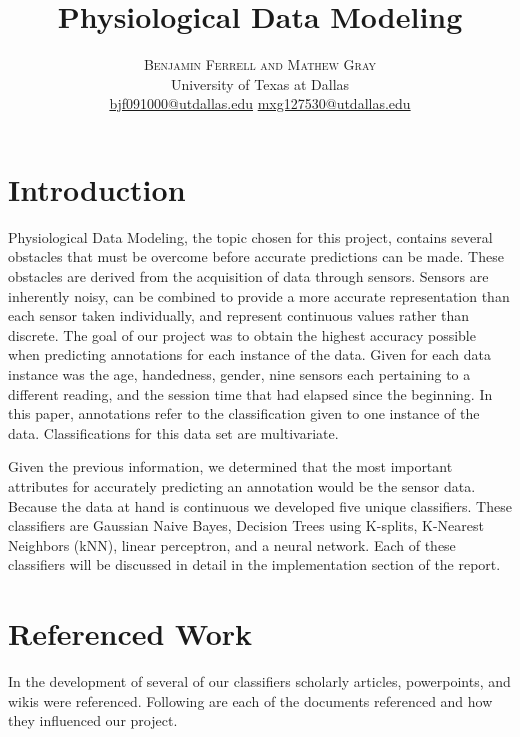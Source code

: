 \documentclass[twoside]{article}
\title{\vspace{-15mm}\fontsize{24pt}{10pt}\selectfont\textbf{Physiological Data Modeling}} %
\author{
\large
\textsc{Benjamin Ferrell and Mathew Gray}\\[2mm] %
\normalsize University of Texas at Dallas \\ %
\normalsize \href{mailto:bjf091000@utdallas.edu}{bjf091000@utdallas.edu}  \href{mailto:mxg127530@utdallas.edu}{mxg127530@utdallas.edu} %
\vspace{-5mm}
}
\date{}
\begin{document}
\maketitle %

\thispagestyle{fancy} %

\begin{multicols}{2}


\section{Introduction}

Physiological Data Modeling, the topic chosen for this project, contains several obstacles that must be overcome before accurate predictions can be made.  These obstacles are derived from the acquisition of data through sensors.  Sensors are inherently noisy, can be combined to provide a more accurate representation than each sensor taken individually, and represent continuous values rather than discrete.  The goal of our project was to obtain the highest accuracy possible when predicting annotations for each instance of the data.  Given for each data instance was the age, handedness, gender, nine sensors each pertaining to a different reading, and the session time that had elapsed since the beginning.  In this paper, annotations refer to the classification given to one instance of the data.  Classifications for this data set are multivariate.

Given the previous information, we determined that the most important attributes for accurately predicting an annotation would be the sensor data.  Because the data at hand is continuous we developed five unique classifiers.  These classifiers are Gaussian Naive Bayes, Decision Trees using K-splits, K-Nearest Neighbors (kNN), linear perceptron, and a neural network.  Each of these classifiers will be discussed in detail in the implementation section of the report.

\section{Referenced Work}

In the development of several of our classifiers scholarly articles, powerpoints, and wikis were referenced.  Following are each of the documents referenced and how they influenced our project.


\end{multicols}
\end{document}
